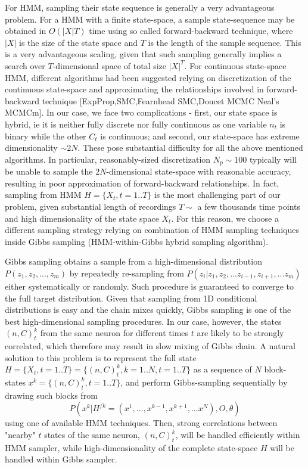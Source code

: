 \documentclass[amsmath,amssymb]{revtex4}
\begin{document}
For HMM, sampling their state sequence is generally a very advantageous problem. For a HMM with a finite state-space, a sample state-sequence may be obtained in $O(|X|T)$ time using so called forward-backward technique, where $|X|$ is the size of the state space and $T$ is the length of the sample sequence. This is a very advantageous scaling, given that such sampling generally implies a search over $T$-dimensional space of total size $|X|^T$. For continuous state-space HMM, different algorithms had been suggested relying on discretization of the continuous state-space and approximating the relationships involved in forward-backward technique [ExpProp,SMC,Fearnhead SMC,Doucet MCMC Neal's MCMCm]. In our case, we face two complications - first, our state space is hybrid, ie it is neither fully discrete nor fully continuous as one variable $n_t$ is binary while the other $C_t$ is continuous; and second, our state-space has extreme dimensionality $\sim 2N$. These pose substantial difficulty for all the above mentioned algorithms. In particular, reasonably-sized discretization $N_p\sim 100$ typically will be unable to sample the $2N$-dimensional state-space with reasonable accuracy, resulting in poor approximation of forward-backward relationships.
In fact, sampling from HMM $H=\{X_t,t=1..T\}$ is the most challenging part of our problem, given substantial length of recordings $T\sim$ a few thousands time points and high dimensionality of the state space $X_t$.
For this reason, we choose a different sampling strategy relying on combination of HMM sampling techniques inside Gibbs sampling (HMM-within-Gibbs hybrid sampling algorithm).

Gibbs sampling obtains a sample from a high-dimensional distribution $P(z_1,z_2,...,z_m)$ by repeatedly re-sampling from $P(z_i|z_1,z_2,...z_{i-1},z_{i+1},...z_m)$ either systematically or randomly. Such procedure is guaranteed to converge to the full target distribution. Given that sampling from 1D conditional distributions is easy and the chain mixes quickly, Gibbs sampling is one of the best high-dimensional sampling procedures. In our case, however, the states $(n,C)^k_t$ from the same neuron for different times $t$ are likely to be strongly correlated, which therefore may result in slow mixing of Gibbs chain. A natural solution to this problem is to represent the full state $H=\{X_t,t=1..T\}=\{(n,C)^k_t,k=1..N,t=1..T\}$ as a sequence of $N$ block-states $x^k=\{(n,C)^k_t,t=1..T\}$, and perform Gibbs-sampling sequentially by drawing such blocks from \begin{equation}
P(x^k|H^{/k}=(x^1,...,x^{k-1},x^{k+1},...x^N),O,\theta)
\end{equation}
using one of available HMM techniques. Then, strong correlations between "nearby" $t$ states of the same neuron, $(n,C)^k_t$, will be handled efficiently within HMM sampler, while high-dimensionality of the complete state-space $H$ will be handled within Gibbs sampler.
\end{document}
